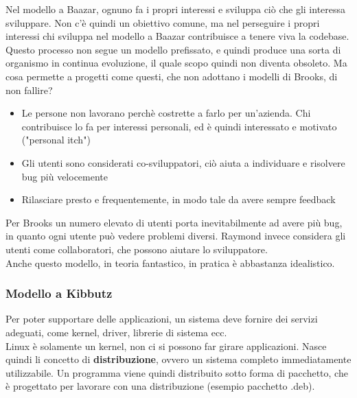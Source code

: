\documentclass[a4paper,12pt]{article}
\begin{document}
Nel modello a Baazar, ognuno fa i propri interessi e sviluppa ciò che gli interessa sviluppare. Non c'è quindi un obiettivo comune, ma nel perseguire i propri interessi chi sviluppa nel modello a Baazar contribuisce a tenere viva la codebase. Questo processo non segue un modello prefissato, e quindi produce una sorta di organismo in continua evoluzione, il quale scopo quindi non diventa obsoleto.
Ma cosa permette a progetti come questi, che non adottano i modelli di Brooks, di non fallire?
\begin{itemize}
 \item Le persone non lavorano perchè costrette a farlo per un'azienda. Chi contribuisce lo fa per interessi personali, ed è quindi interessato e motivato ("personal itch")
 \item Gli utenti sono considerati co-sviluppatori, ciò aiuta a individuare e risolvere bug più velocemente
 \item Rilasciare presto e frequentemente, in modo tale da avere sempre feedback
\end{itemize}


Per Brooks un numero elevato di utenti porta inevitabilmente ad avere più bug, in quanto ogni utente può vedere problemi diversi. Raymond invece considera gli utenti come collaboratori, che possono aiutare lo sviluppatore.\\
Anche questo modello, in teoria fantastico, in pratica è abbastanza idealistico.

\subsubsection{Modello a Kibbutz}
Per poter supportare delle applicazioni, un sistema deve fornire dei servizi adeguati, come kernel, driver, librerie di sistema ecc.\\
Linux è solamente un kernel, non ci si possono far girare applicazioni. Nasce quindi li concetto di \textbf{distribuzione}, ovvero un sistema completo immediatamente utilizzabile. Un programma viene quindi distribuito sotto forma di pacchetto, che è progettato per lavorare con una distribuzione (esempio pacchetto .deb).

\end{document}
